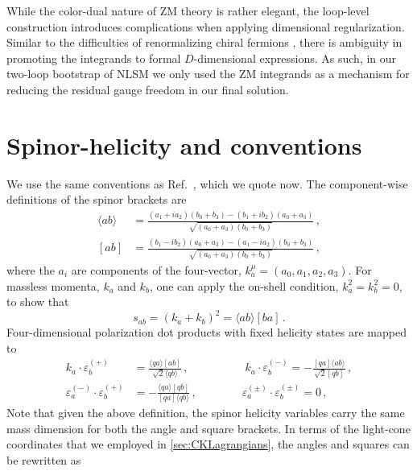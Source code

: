 \documentclass[11pt,letter]{article}
\begin{document}
While the color-dual nature of ZM theory is rather elegant, the
loop-level construction introduces complications when applying
dimensional regularization. Similar to the difficulties of
renormalizing chiral fermions \cite{tHooft:1972tcz}, there is ambiguity
in promoting the integrands to formal $D$-dimensional expressions. As
such, in our two-loop bootstrap of NLSM we only used the ZM
integrands as a mechanism for reducing the residual gauge freedom in
our final solution.

\section{Spinor-helicity and conventions}\label{Conventions}

We use the same conventions as Ref.~\cite{jjmcTASI2014}, which
we quote now. The component-wise definitions of the spinor brackets are
\begin{align}
\langle ab \rangle &= \frac{(a_1 + i a_2)(b_0+b_3)-(b_1 + i b_2)(a_0+a_3)}{\sqrt{(a_0+a_3)(b_0+b_3)}}\,,
\\
[ab] &= \frac{(b_1 - i b_2)(a_0+a_3)-(a_1 - i a_2)(b_0+b_3)}{\sqrt{(a_0+a_3)(b_0+b_3)}}\,,
\end{align}
where the $a_i$ are components of the four-vector,
$k^\mu_a = (a_0,a_1,a_2,a_3)$. For massless momenta, $k_a$ and $k_b$,
one can apply the on-shell condition, $k_a^2=k_b^2=0$, to show that
\begin{equation}
s_{ab} = (k_a+k_b)^2= \langle ab \rangle[ba]\,.
\end{equation}
Four-dimensional polarization dot products with fixed helicity states
are mapped to
\begin{equation}\label{eq:4DPols}
\begin{aligned}
k_a \cdot \varepsilon_b^{(+)} &= \frac{\langle q a \rangle[ab]}{\sqrt{2}\langle q b\rangle}\,,
\qquad\quad \qquad
k_a \cdot \varepsilon_b^{(-)} = -\frac{[qa]\langle ab\rangle}{\sqrt{2}[qb]}\,,
\\
\varepsilon_a^{(-)}\cdot \varepsilon_b^{(+)} &= - \frac{\langle q a\rangle [qb]}{ [qa]\langle q b\rangle} \,,
\qquad \qquad
\varepsilon_a^{(\pm)}\cdot \varepsilon_b^{(\pm)} = 0 \,,
\end{aligned}
\end{equation}
Note that given the above definition, the spinor helicity variables
carry the same mass dimension for both the angle and square
brackets. In terms of the light-cone coordinates that we employed in
\cref{sec:CKLagrangians}, the angles and squares can be rewritten as
\end{document}

